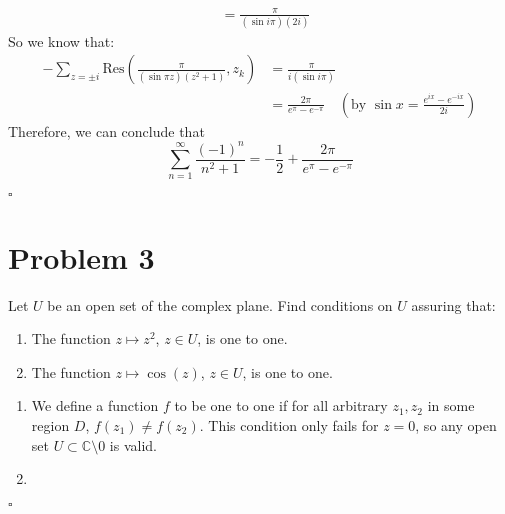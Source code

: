 \documentclass[11pt]{article}
\newcommand{\C}{\mathbb{C}}
\newenvironment{proof}{\noindent{\bf Proof.}}{\hfill $\square$\medskip}
\begin{document}
\begin{proof}
\begin{enumerate}[label=\textbf{(\alph*)}]
\begin{equation}
\begin{split}
                &=\frac{\pi}{(\sin i\pi)(2i)}
            \end{split}
        \end{equation}
        So we know that:
        \begin{equation}
            \begin{split}
            -\sum_{z=\pm i}\text{Res}\left(\frac{\pi}{(\sin\pi z)(z^{2}+1)},z_{k}\right)&=\frac{\pi}{i(\sin i\pi)}\\
            &=\frac{2\pi}{e^{\pi}-e^{-\pi}}\quad\left(\text{by }\sin x=\frac{e^{ix}-e^{-ix}}{2i}\right)
            \end{split}
        \end{equation}
        Therefore, we can conclude that
        $$\sum_{n=1}^{\infty}\frac{(-1)^{n}}{n^{2}+1}=-\frac{1}{2}+\frac{2\pi}{e^{\pi}-e^{-\pi}}$$
    \end{enumerate}

\end{proof}


\section{Problem 3}
Let $U$ be an open set of the complex plane. Find conditions on $U$ assuring that:
\begin{enumerate}[label=\textbf{(\alph*)}]
    \item The function $z\mapsto z^{2}$, $z\in U$, is one to one.
    \item The function $z\mapsto \cos(z)$, $z\in U$, is one to one.
\end{enumerate}

\begin{proof}
    \begin{enumerate}[label=\textbf{(\alph*)}]
        \item We define a function $f$ to be one to one if for all arbitrary $z_{1}, z_{2}$ in some region
        $D$, $f(z_{1})\neq f(z_{2})$. This condition only fails for $z=0$, so any open set $U\subset\C\setminus0$ is valid.
        \item 
    \end{enumerate}
\end{proof}
\end{document}
